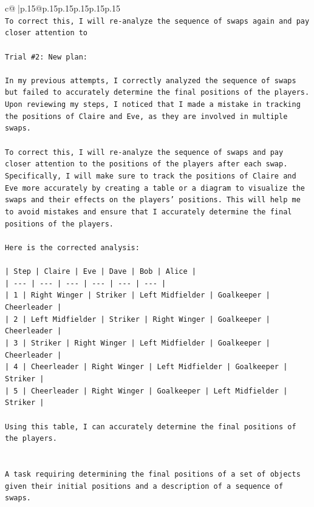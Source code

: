 \documentclass{article}
\begin{document}
{\begin{supertabular}{c@{$\;$}|p{.15\linewidth}@{}p{.15\linewidth}p{.15\linewidth}p{.15\linewidth}p{.15\linewidth}p{.15\linewidth}}
{{{\\ 
\texttt{To correct this, I will re{-}analyze the sequence of swaps again and pay closer attention to} \\
\\ 
\texttt{Trial \#2: New plan: } \\
\\ 
\texttt{In my previous attempts, I correctly analyzed the sequence of swaps but failed to accurately determine the final positions of the players. Upon reviewing my steps, I noticed that I made a mistake in tracking the positions of Claire and Eve, as they are involved in multiple swaps. } \\
\\ 
\texttt{To correct this, I will re{-}analyze the sequence of swaps and pay closer attention to the positions of the players after each swap. Specifically, I will make sure to track the positions of Claire and Eve more accurately by creating a table or a diagram to visualize the swaps and their effects on the players' positions. This will help me to avoid mistakes and ensure that I accurately determine the final positions of the players. } \\
\\ 
\texttt{Here is the corrected analysis:} \\
\\ 
\texttt{| Step | Claire | Eve | Dave | Bob | Alice |} \\
\texttt{| {-}{-}{-} | {-}{-}{-} | {-}{-}{-} | {-}{-}{-} | {-}{-}{-} | {-}{-}{-} |} \\
\texttt{| 1    | Right Winger | Striker | Left Midfielder | Goalkeeper | Cheerleader |} \\
\texttt{| 2    | Left Midfielder | Striker | Right Winger | Goalkeeper | Cheerleader |} \\
\texttt{| 3    | Striker | Right Winger | Left Midfielder | Goalkeeper | Cheerleader |} \\
\texttt{| 4    | Cheerleader | Right Winger | Left Midfielder | Goalkeeper | Striker |} \\
\texttt{| 5    | Cheerleader | Right Winger | Goalkeeper | Left Midfielder | Striker |} \\
\\ 
\texttt{Using this table, I can accurately determine the final positions of the players.} \\
\\ 
\\ 
\texttt{A task requiring determining the final positions of a set of objects given their initial positions and a description of a sequence of swaps.} \\
}}}
\end{supertabular}}
\end{document}

